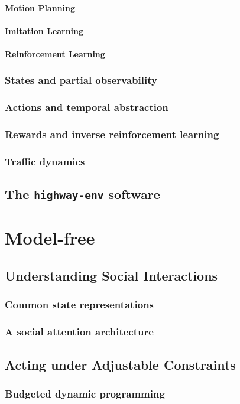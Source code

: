 \subsection*{Motion Planning}
\subsection*{Imitation Learning}
\subsection*{Reinforcement Learning}
\section{States and partial observability}
\section{Actions and temporal abstraction}
\section{Rewards and inverse reinforcement learning}
\section{Traffic dynamics}
\chapter{The \texttt{highway-env} software}
\part{Model-free}
\chapter{Understanding Social Interactions}
\section{Common state representations}
\section{A social attention architecture}
\chapter{Acting under Adjustable Constraints}
\section{Budgeted dynamic programming}
